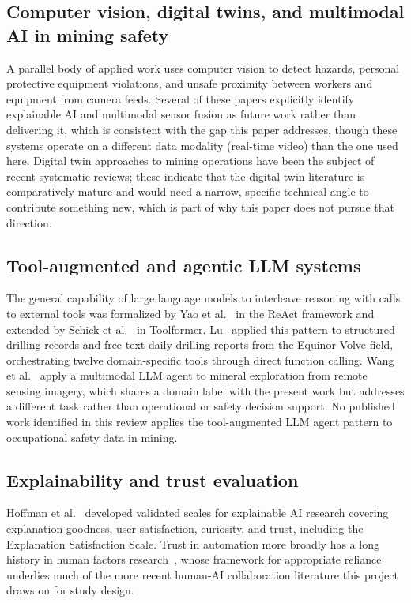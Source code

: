 \documentclass[11pt,a4paper]{article}
\begin{document}
\subsection{Computer vision, digital twins, and multimodal AI in mining safety}

A parallel body of applied work uses computer vision to detect hazards,
personal protective equipment violations, and unsafe proximity between workers
and equipment from camera feeds. Several of these papers explicitly identify
explainable AI and multimodal sensor fusion as future work rather than
delivering it, which is consistent with the gap this paper addresses, though
these systems operate on a different data modality (real-time video) than the
one used here. Digital twin approaches to mining operations have been the
subject of recent systematic reviews; these indicate that the digital twin
literature is comparatively mature and would need a narrow, specific technical
angle to contribute something new, which is part of why this paper does not
pursue that direction.

\subsection{Tool-augmented and agentic LLM systems}

The general capability of large language models to interleave reasoning with
calls to external tools was formalized by Yao et al.~\cite{Yao2023} in the
ReAct framework and extended by Schick et al.~\cite{Schick2023} in Toolformer.
Lu~\cite{Lu2026} applied this pattern to structured drilling records and free
text daily drilling reports from the Equinor Volve field, orchestrating twelve
domain-specific tools through direct function calling. Wang et al.~\cite{Wang2024}
apply a multimodal LLM agent to mineral exploration from remote sensing
imagery, which shares a domain label with the present work but addresses a
different task rather than operational or safety decision support. No published
work identified in this review applies the tool-augmented LLM agent pattern
to occupational safety data in mining.

\subsection{Explainability and trust evaluation}

Hoffman et al.~\cite{Hoffman2023} developed validated scales for explainable
AI research covering explanation goodness, user satisfaction, curiosity, and
trust, including the Explanation Satisfaction Scale. Trust in automation more
broadly has a long history in human factors research~\cite{Lee2004}, whose
framework for appropriate reliance underlies much of the more recent human-AI
collaboration literature this project draws on for study design.
\end{document}
